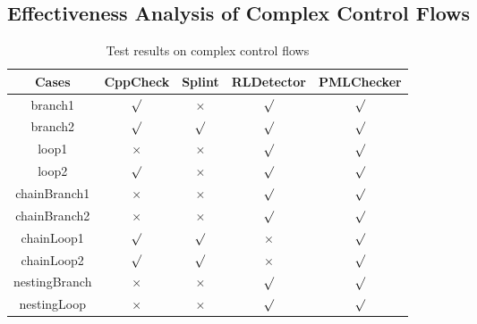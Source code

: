 \subsection{Effectiveness Analysis of Complex Control Flows}

\begin{table}[!h]
\center
\caption{Test results on complex control flows}\label{tab:7}
\begin{tabular}{|c|c|c|c|c|}
\hline
\textbf{Cases}  & \textbf{CppCheck} & \textbf{Splint} & \textbf{RLDetector} & \textbf{PMLChecker}\\
\hline
branch1	 &$\surd$ & $\times$ & $\surd$ & $\surd$\\
\hline
branch2    & $\surd$ & $\surd$ & $\surd$ & $\surd$\\
\hline
loop1	 &$\times$ &	$\times$ & $\surd$ & $\surd$\\
\hline
loop2    & $\surd$ &$\times$ & $\surd$ & $\surd$\\
\hline
chainBranch1 & $\times$ & $\times$ & $\surd$ & $\surd$\\
\hline
chainBranch2 &	$\times$	& $\times$ & $\surd$ & $\surd$\\
\hline
chainLoop1	 & $\surd$ & $\surd$ & $\times$ & $\surd$\\
\hline
chainLoop2	 & $\surd$& $\surd$ & $\times$ & $\surd$\\
\hline
nestingBranch	 & $\times$ & $\times$ & $\surd$ & $\surd$\\
\hline
nestingLoop& $\times$ & $\times$ & $\surd$ & $\surd$\\
\hline
\end{tabular}
\end{table}



